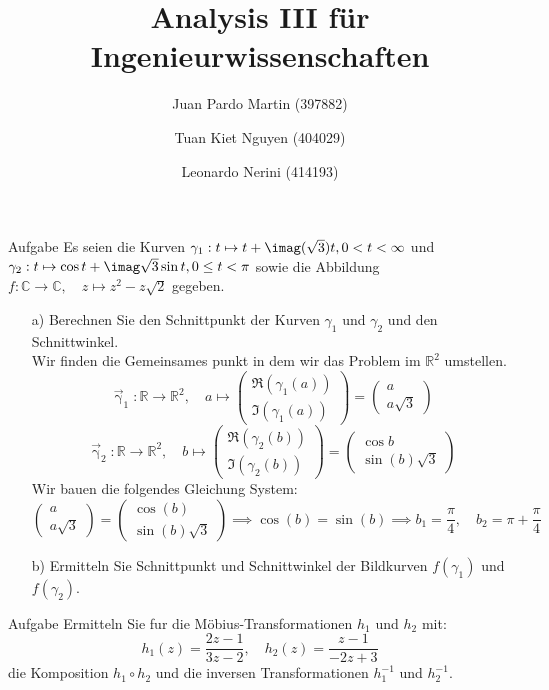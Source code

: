 \documentclass{scrartcl}
\title{Analysis III für Ingenieurwissenschaften}
\author{Juan Pardo Martin (397882)\and Tuan Kiet Nguyen (404029)\and Leonardo Nerini (414193)}
\def\mbb#1{\mathbb{#1}}
\def\bC{\mbb{C}}
\def\bR{\mbb{R}}
\newcommand{\func}[3]{#1\colon#2\to#3}
\newcommand{\vfunc}[5]{\func{#1}{#2}{#3},\quad#4\longmapsto#5}
\begin{document}
\maketitle
\begin{section}{Aufgabe}%
Es seien die Kurven \(\gamma_1 : t \mapsto t + \imag(\sqrt 3)t, 0 < t < \infty\) 
und 
\(\gamma_2 : t \mapsto \cos t + \imag\sqrt 3 \sin t, 0 \leq t < \pi\)
sowie die Abbildung \(\vfunc{f}{\bC}{\bC}{z}{z^2-z\sqrt 2}\)
 gegeben.
\begin{itemize}
\item[a)]
Berechnen Sie den Schnittpunkt der Kurven $\gamma_1$ und $\gamma_2$ und den Schnittwinkel.\\
Wir finden die Gemeinsames punkt in dem wir das Problem im $\bR^2$ umstellen.
\[\vfunc{\vec{\upgamma}_1}{\bR}{\bR^2}{a}{\begin{pmatrix}\Re(\gamma_1(a))\\\Im(\gamma_1(a))\end{pmatrix}
=\begin{pmatrix}a\\a\sqrt{3}\end{pmatrix}}\]
\[\vfunc{\vec{\upgamma}_2}{\bR}{\bR^2}{b}{\begin{pmatrix}\Re(\gamma_2(b))\\\Im(\gamma_2(b))\end{pmatrix}
=\begin{pmatrix}\cos b\\\sin(b)\sqrt{3}\end{pmatrix}}\]
Wir bauen die folgendes Gleichung System:
\[\begin{pmatrix}a\\a\sqrt{3}\end{pmatrix}=\begin{pmatrix}\cos(b)\\\sin(b)\sqrt{3}\end{pmatrix}\implies \cos(b)=\sin(b)\implies b_1=\frac{\pi}{4},\quad b_2=\pi+\frac{\pi}{4}\]

\item[b)]
Ermitteln Sie Schnittpunkt und Schnittwinkel der Bildkurven $f(\gamma_1)$ und $f(\gamma_2)$.
\end{itemize}


\end{section}
\begin{section}{Aufgabe}%
Ermitteln Sie fur die Möbius-Transformationen $h_1$ und $h_2$ mit:
\[h_1(z)=\frac{2z-1}{3z-2},\quad h_2(z)=\frac{z-1}{-2z+3}\]
die Komposition $h_1 \circ h_2$ und die inversen Transformationen $h_1^{-1}$ und $h_2^{-1}$.

\end{section}
\end{document}
